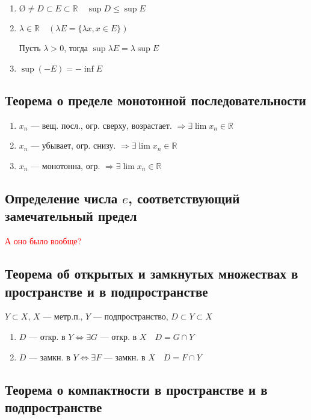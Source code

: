 \begin{enumerate}
    \item $\text{\O}\not =D\subset E\subset \mathbb{R} \quad \sup D\leq \sup E$
    \item $\lambda\in\mathbb{R} \quad (\lambda E=\{\lambda x, x\in E\})$

    Пусть $\lambda>0$, тогда $\sup \lambda E=\lambda\sup E$
    \item $\sup(-E)=-\inf E$
\end{enumerate}

\subsection{Теорема о пределе монотонной последовательности}

\begin{enumerate}
    \item $x_n$ --- вещ. посл., огр. сверху, возрастает. $\Rightarrow \exists\lim x_n\in\mathbb{R}$
    \item $x_n$ --- убывает, огр. снизу. $\Rightarrow \exists \lim x_n\in\mathbb{R}$
    \item $x_n$ --- монотонна, огр. $\Rightarrow \exists \lim x_n\in\mathbb{R}$
\end{enumerate}

\subsection{Определение числа $e$, соответствующий замечательный предел}

\textcolor{red}{А оно было вообще?}

\subsection{Теорема об открытых и замкнутых множествах в пространстве и в подпространстве}

$Y\subset X$, $X$ --- метр.п., $Y$ --- подпространство, $D\subset Y\subset X$

\begin{enumerate}
    \item $D$ --- откр. в $Y \Leftrightarrow \exists G$ --- откр. в $X \quad D=G\cap Y$
    \item $D$ --- замкн. в $Y \Leftrightarrow \exists F$ --- замкн. в $X \quad D=F\cap Y$
\end{enumerate}

\subsection{Теорема о компактности в пространстве и в подпространстве}


